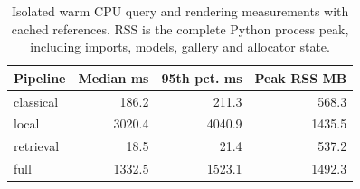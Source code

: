 \begin{table}[htbp]\centering\small
\caption{Isolated warm CPU query and rendering measurements with cached references. RSS is the complete Python process peak, including imports, models, gallery and allocator state.}\label{tab:profiles}
\begin{tabular}{lrrr}
\toprule
Pipeline & Median ms & 95th pct. ms & Peak RSS MB \\
\midrule
classical & 186.2 & 211.3 & 568.3 \\
local & 3020.4 & 4040.9 & 1435.5 \\
retrieval & 18.5 & 21.4 & 537.2 \\
full & 1332.5 & 1523.1 & 1492.3 \\
\bottomrule
\end{tabular}\end{table}
